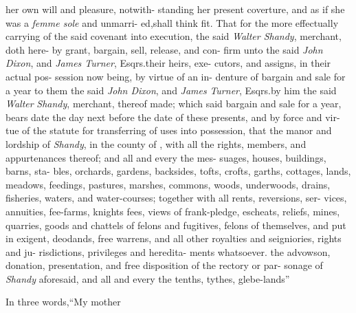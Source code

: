 \documentclass{article}
\begin{document}
\begin{story}{}
    her own will and pleasure, notwith-\break
    standing her present coverture, and as\break
    if she was a \textit{femme sole} and unmarri-\break
    ed,\tsk  shall think fit.\tsk {}\break
    \break
    That for the more effectually carrying\break
    of the said covenant into execution, the\break
    said \textit{Walter Shandy}, merchant, doth here-\break
    by grant, bargain, sell, release, and con-\break
    firm unto the said \textit{John Dixon}, and\break
    \textit{James Turner}, Esqrs.\@ their heirs, exe-\pb 
    cutors, and assigns, in their actual pos-\break
    session now being, by virtue of an in-\break
    denture of bargain and sale for a year\break
    to them the said \textit{John Dixon}, and \textit{James}\break
    \textit{Turner}, Esqrs.\@ by him the said \textit{Walter}\break
    \textit{Shandy}, merchant, thereof made; which\break
    said bargain and sale for a year, bears\break
    date the day next before the date of\break
    these presents, and by force and vir-\break
    tue of the statute for transferring of\break
    uses into possession,\tsk  {} that\break
    the manor and lordship of \textit{Shandy}, in\break
    the county of \tsh  , with all the\break
    rights, members, and appurtenances\break
    thereof; and all and every the mes-\break
    suages, houses, buildings, barns, sta-\break
    bles, orchards, gardens, backsides,\break
    tofts, crofts, garths, cottages, lands,\break
    meadows, feedings, pastures, marshes,\break
    commons, woods, underwoods, drains,\break
    fisheries, waters, and water-courses;\tsk\pb  
    together with all rents, reversions, ser-\break
    vices, annuities, fee-farms, knights\break
    fees, views of frank-pledge, escheats,\break
    reliefs, mines, quarries, goods and\break
    chattels of felons and fugitives, felons\break
    of themselves, and put in exigent,\break
    deodands, free warrens, and all other\break
    royalties and seigniories, rights and ju-\break
    risdictions, privileges and heredita-\break
    ments whatsoever.\tsk  {} the\break
    advowson, donation, presentation, and\break
    free disposition of the rectory or par-\break
    sonage of \textit{Shandy} aforesaid, and all and\break
    every the tenths, tythes, glebe-lands”
    \end{story}

\noindent\tsh  In three
words,\tsh  “My mother\break
{}
\end{document}
